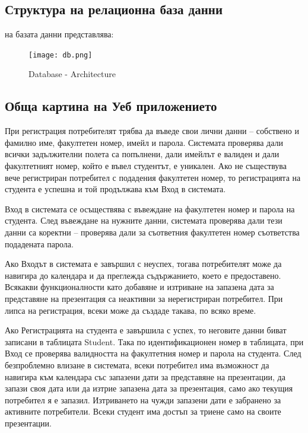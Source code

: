 \documentclass[12pt]{article}
\begin{document}
\newpage

\subsection{Структура на релационна база данни}
 на базата данни представлява:

\begin{figure}[h!]
\centering
    \texttt{[image: db.png]}
  \caption{Database - Architecture}
\end{figure}

\subsection{Обща картина на Уеб приложението}
\noindent При регистрация потребителят трябва да въведе свои лични данни – собствено и фамилно име, факултетен номер, имейл и парола. Системата проверява дали всички задължителни полета са попълнени, дали имейлът е валиден и дали факултетният номер, който е въвел студентът, е уникален. Ако не съществува вече регистриран потребител с подадения факултетен номер, то регистрацията на студента е успешна и той продължава към Вход в системата. 
\medskip

\noindent Вход в системата се осъществява с въвеждане на факултетен номер и парола на студента. След въвеждане на нужните данни, системата проверява дали тези данни са коректни – проверява дали за съответния факултетен номер съответства подадената парола.
\medskip

\noindent Ако Входът в системата е завършил с неуспех, тогава потребителят може да навигира до календара и да преглежда съдържанието, което е предоставено. Всякакви функционалности като добавяне и изтриване на запазена дата за представяне на презентация са неактивни за нерегистриран потребител. При липса на регистрация, всеки може да създаде такава, по всяко време. 
\medskip

\noindent Ако Регистрацията на студента е завършила с успех, то неговите данни биват записани в таблицата Student. Така по идентификационен номер в таблицата, при Вход се проверява валидността на факултетния номер и парола на студента. След безпроблемно влизане в системата, всеки потребител има възможност да навигира към календара със запазени дати за представяне на презентации, да запази своя дата или да изтрие запазена дата за презентация, само ако текущия потребител я е запазил.  Изтриването на чужди запазени дати е забранено за активните потребители. Всеки студент има достъп за триене само на своите презентации.
\medskip
\end{document}
